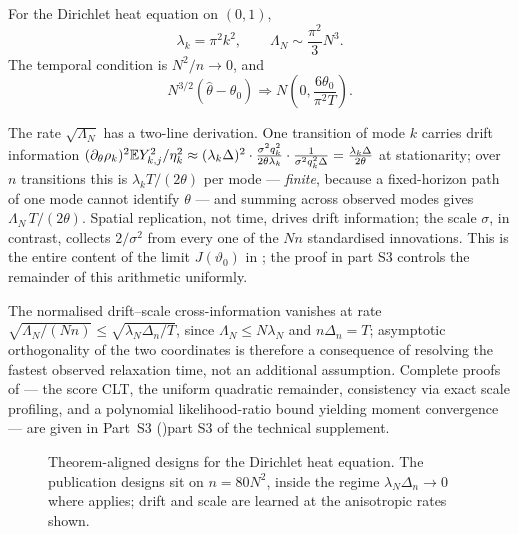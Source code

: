For the Dirichlet heat equation on $(0,1)$,
\[
 \lambda_k=\pi^2k^2,
 \qquad
 \Lambda_N\sim\frac{\pi^2}{3}N^3.
\]
The temporal condition is $N^2/n\to0$, and
\[
 N^{3/2}(\widehat\theta-\theta_0)
 \Rightarrow
 N\left(0,\frac{6\theta_0}{\pi^2T}\right).
\]

\begin{remark}\label{rem:info-arith}
The rate $\sqrt{\Lambda_N}$ has a two-line derivation. One transition of mode $k$ carries drift information $(\partial_\theta\rho_k)^2\mathbb E Y_{k,j}^2/\eta_k^2\approx(\lambda_k\Delta)^2\cdot\frac{\sigma^2q_k^2}{2\theta\lambda_k}\cdot\frac1{\sigma^2q_k^2\Delta}=\frac{\lambda_k\Delta}{2\theta}$ at stationarity; over $n$ transitions this is $\lambda_kT/(2\theta)$ per mode --- \emph{finite}, because a fixed-horizon path of one mode cannot identify $\theta$ --- and summing across observed modes gives $\Lambda_N\,T/(2\theta)$. Spatial replication, not time, drives drift information; the scale $\sigma$, in contrast, collects $2/\sigma^2$ from every one of the $Nn$ standardised innovations. This is the entire content of the limit $J(\vartheta_0)$ in ; the proof in part S3 controls the remainder of this arithmetic uniformly.
\end{remark}

\begin{remark}\label{rem:cross}
The normalised drift--scale cross-information vanishes at rate
$\sqrt{\Lambda_N/(Nn)}\le\sqrt{\lambda_N\Delta_n/T}$, since
$\Lambda_N\le N\lambda_N$ and $n\Delta_n=T$; asymptotic orthogonality of
the two coordinates is therefore a consequence of resolving the fastest
observed relaxation time, not an additional assumption. Complete proofs of
 --- the score CLT, the uniform quadratic remainder,
consistency via exact scale profiling, and a polynomial likelihood-ratio
bound yielding moment convergence --- are given in \ifdefined\MERGEDDOC Part~S3 ()\else part S3 of the technical supplement\fi.
\end{remark}

\begin{figure}[t]
\centering
\resizebox{.9\textwidth}{!}{}
\caption{Theorem-aligned designs for the Dirichlet heat equation. The publication designs sit on $n=80N^2$, inside the regime $\lambda_N\Delta_n\to0$ where  applies; drift and scale are learned at the anisotropic rates shown.}
\label{fig:regimes}
\end{figure}

